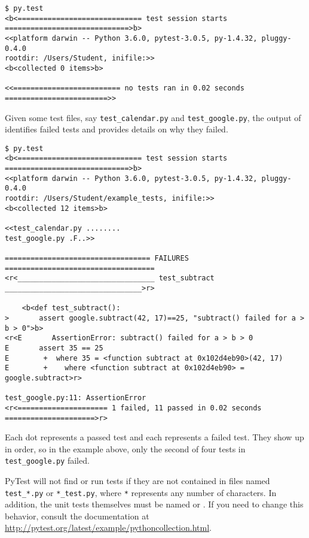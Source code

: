 \begin{lstlisting}
$ py.test
<b<============================= test session starts =============================>b>
<<platform darwin -- Python 3.6.0, pytest-3.0.5, py-1.4.32, pluggy-0.4.0
rootdir: /Users/Student, inifile:>>
<b<collected 0 items>b>

<<========================= no tests ran in 0.02 seconds ========================>>
\end{lstlisting}

Given some test files, say \texttt{test\_calendar.py} and \texttt{test\_google.py}, the output of  identifies failed tests and provides details on why they failed.

\begin{lstlisting}
$ py.test
<b<============================= test session starts =============================>b>
<<platform darwin -- Python 3.6.0, pytest-3.0.5, py-1.4.32, pluggy-0.4.0
rootdir: /Users/Student/example_tests, inifile:>>
<b<collected 12 items>b>

<<test_calendar.py ........
test_google.py .F..>>

================================== FAILURES ===================================
<r<________________________________ test_subtract ________________________________>r>

    <b<def test_subtract():
>       assert google.subtract(42, 17)==25, "subtract() failed for a > b > 0">b>
<r<E       AssertionError: subtract() failed for a > b > 0
E       assert 35 == 25
E        +  where 35 = <function subtract at 0x102d4eb90>(42, 17)
E        +    where <function subtract at 0x102d4eb90> = google.subtract>r>

test_google.py:11: AssertionError
<r<===================== 1 failed, 11 passed in 0.02 seconds =====================>r>
\end{lstlisting}

Each dot represents a passed test and each  represents a failed test. %
They show up in order, so in the example above, only the second of four tests in \texttt{test\_google.py} failed.

\begin{warn} %
PyTest will not find or run tests if they are not contained in files named \texttt{test\_*.py} or \texttt{*\_test.py}, where \texttt{*} represents any number of characters.
In addition, the unit tests themselves must be named  or .
If you need to change this behavior, consult the documentation at \url{http://pytest.org/latest/example/pythoncollection.html}.
\end{warn}

